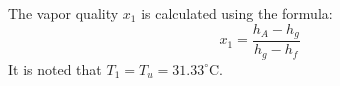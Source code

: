 The vapor quality \( x_1 \) is calculated using the formula:  
\[
x_1 = \frac{h_A - h_g}{h_g - h_f}
\]  
It is noted that \( T_1 = T_u = 31.33^\circ\text{C} \).